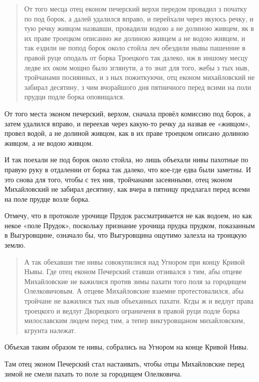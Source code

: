 \begin{quotation}
От того месца отец економ печерский верхи передом провадил з початку по под борок, а далей удалился вправо, и перейхали через якуюсь речку, и тую речку живцом назвавши, провадили водою а не долиною живцем, як в их праве троецком описанно же долиною живцем а не водою живцем, и так ездили не попод борок около стойла леч обездили нывы пашенние в правой руце оподаль от борка Троецкого так далеко, иж в иншому месцу ледве их оком мощно было зглянути, а то знат для того, жебы з тых ныв, тройчанами посиянных, и з ных пожиткуючи, отц економ михайловский не забирал десятину, з чим вчорайшого дня пятничного перед всими на поли прудци подле борка оповищался.
\end{quotation}

От того места эконом печерский, верхом, сначала провёл комиссию под борок, а затем удалился вправо, и переехав через какую-то речку да назвав ее «живцом», провел водой, а не долиной живцом, как в их праве троецком описано долиною живцом, а не водою живцом. 

И так поехали не под борок около стойла, но лишь объехали нивы пахотные по правую руку в отдалении от борка так далеко, что кое-где едва были заметны. И это снова для того, чтобы с тех нив, тройчанами засеянными, отец эконом Михайловский не забирал десятину, как вчера в пятницу предлагал перед всеми на поле прудце возле борка.

Отмечу, что в протоколе урочище Прудок рассматривается не как водоем, но как некое «поле Прудок», поскольку признание урочища прудка прудком, показанным в Выгуровщине, означало бы, что Выгуровщина ощутимо залезла на троицкую землю.

\begin{quotation}
А так обехавши тие нивы совокупилися над Угнором при концу Кривой Нывы. Где отец економ Печерский ставши отзивался з тим, абы отцеве Михайловские не важилися против зимы пахати того поля за городищем Олелковичовым. А отцеве Михайловские взаемне протестовалился, абы тройчане не важилися тых ныв объеханных пахати. Кгды ж и ведлуг права троецкого и ведлуг Дворецкого ограниченя в правой руци подле борка милославским людем перед тим, а тепер викгуровщаном михайловским, кгрунта
належат.
\end{quotation}

Объехав таким образом те нивы, собрались на Угнором на конце Кривой Нивы. 

Там отец эконом Печерский стал настаивать, чтобы отцы Михайловские перед зимой не смели пахать то поле за городищем Олелковича. 

